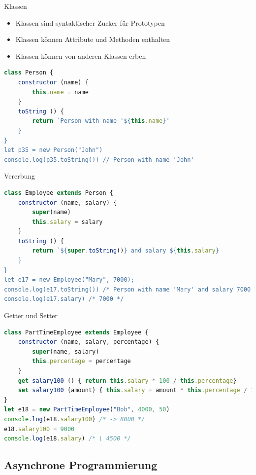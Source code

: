 \begin{definition}{Klassen}
    \begin{itemize}
        \item Klassen sind syntaktischer Zucker für Prototypen
        \item Klassen können Attribute und Methoden enthalten
        \item Klassen können von anderen Klassen erben
    \end{itemize}
\begin{lstlisting}[language=JavaScript, style=basesmol]
class Person {
    constructor (name) {
        this.name = name
    }
    toString () {
        return `Person with name '${this.name}'
    }
}
let p35 = new Person("John")
console.log(p35.toString()) // Person with name 'John'
\end{lstlisting}
\end{definition}

\begin{code}{Vererbung}
\begin{lstlisting}[language=JavaScript, style=basesmol]
class Employee extends Person {
    constructor (name, salary) {
        super(name)
        this.salary = salary
    }
    toString () {
        return `${super.toString()} and salary ${this.salary}
    }
}
let e17 = new Employee("Mary", 7000);
console.log(e17.toString()) /* Person with name 'Mary' and salary 7000 */
console.log(e17.salary) /* 7000 */
\end{lstlisting}
\end{code}

\begin{examplecode}{Getter und Setter}
\begin{lstlisting}[language=JavaScript, style=basesmol]
class PartTimeEmployee extends Employee {
    constructor (name, salary, percentage) {
        super(name, salary)
        this.percentage = percentage
    }
    get salary100 () { return this.salary * 100 / this.percentage}
    set salary100 (amount) { this.salary = amount * this.percentage / 100 }
}
let e18 = new PartTimeEmployee("Bob", 4000, 50)
console.log(e18.salary100) /* -> 8000 */
e18.salary100 = 9000
console.log(e18.salary) /* \ 4500 */
\end{lstlisting}
\end{examplecode}

\columnbreak



\subsection{Asynchrone Programmierung}

